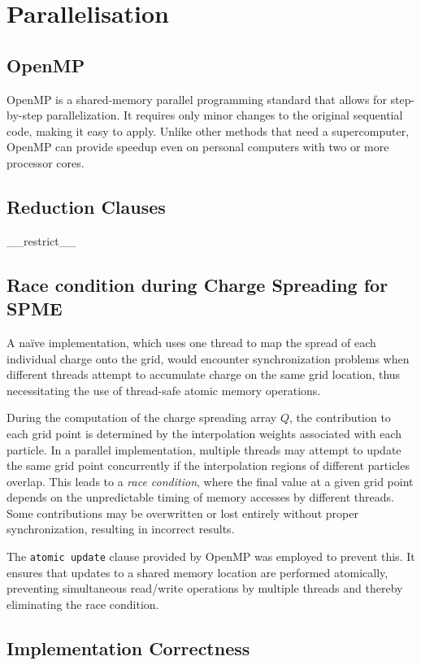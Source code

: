 \section{Parallelisation}

\subsection{OpenMP}
OpenMP is a shared-memory parallel programming standard that allows for step-by-step parallelization. It requires only minor changes to the original sequential code, making it easy to apply. Unlike other methods that need a supercomputer, OpenMP can provide speedup even on personal computers with two or more processor cores.
\subsection{Reduction Clauses}
\_\_restrict\_\_

\subsection{Race condition during Charge Spreading for SPME}
A naïve implementation, which uses one thread to map the spread of each individual charge onto the grid, would encounter synchronization problems when different threads attempt to accumulate charge on the same grid location, thus necessitating the use of thread-safe atomic memory operations.

During the computation of the charge spreading array $Q$, the contribution to each grid point is determined by the interpolation weights associated with each particle. In a parallel implementation, multiple threads may attempt to update the same grid point concurrently if the interpolation regions of different particles overlap. This leads to a \textit{race condition}, where the final value at a given grid point depends on the unpredictable timing of memory accesses by different threads. Some contributions may be overwritten or lost entirely without proper synchronization, resulting in incorrect results.

The \verb|atomic update| clause provided by OpenMP was employed to prevent this. It ensures that updates to a shared memory location are performed atomically, preventing simultaneous read/write operations by multiple threads and thereby eliminating the race condition.
\subsection{Implementation Correctness}

